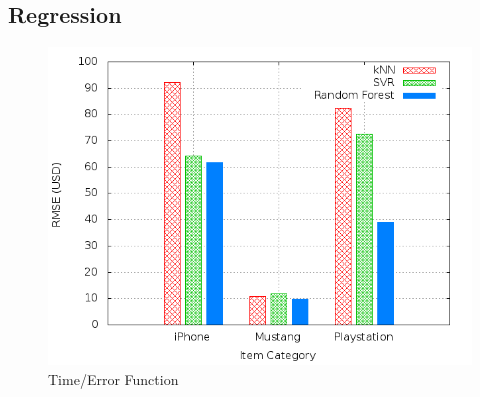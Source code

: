 \subsection{Regression}
\begin{figure}
\centering
\includegraphics[scale=0.55]{images/plots/machine_learning/plot_price_regression_rmse.png}
\caption{Time/Error Function}
\label{crowdsourcing_desc_length}
\end{figure}


